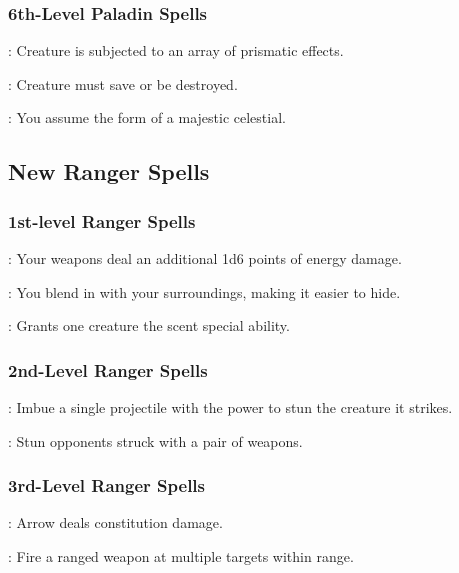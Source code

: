 \subsubsection{6th-Level Paladin Spells}
\begin{list}{}{\leftmargin=1em}
 \item {}: Creature is subjected to an array of prismatic effects.
 \item {}: Creature must save or be destroyed.
 \item {}: You assume the form of a majestic celestial.
\end{list}


\subsection{New Ranger Spells}
\subsubsection{1st-level Ranger Spells}
\begin{list}{}{\leftmargin=1em}
 \item {}: Your weapons deal an additional 1d6 points of energy damage.
 \item {}: You blend in with your surroundings, making it easier to hide.
 \item {}: Grants one creature the scent special ability.
\end{list}
\subsubsection{2nd-Level Ranger Spells}
\begin{list}{}{\leftmargin=1em}
 \item {}: Imbue a single projectile with the power to stun the creature it strikes.
 \item {}: Stun opponents struck with a pair of weapons.
\end{list}
\subsubsection{3rd-Level Ranger Spells}
\begin{list}{}{\leftmargin=1em}
 \item {}: Arrow deals constitution damage.
 \item {}: Fire a ranged weapon at multiple targets within range.
\end{list}
